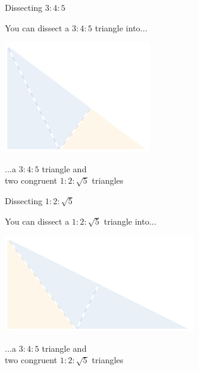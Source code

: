 \documentclass[14pt]{beamer}
\begin{document}

    \begin{frame}{Dissecting $3\!\!:\!\!4\!\!:\!\!5$}
        \begin{center}
            You can dissect a $3\!\!:\!\!4\!\!:\!\!5$ triangle into...

            \bigskip \bigskip

            \includegraphics[height=18ex]{figures/figure006d.pdf}

            \bigskip \bigskip

            ...a $3\!\!:\!\!4\!\!:\!\!5$ triangle and\\two congruent $1\!\!:\!\!2\!\!:\!\!\sqrt{5}$ triangles
        \end{center}
    \end{frame}


    \begin{frame}{Dissecting $1\!\!:\!\!2\!\!:\!\!\sqrt{5}$}
        \begin{center}
            You can dissect a $1\!\!:\!\!2\!\!:\!\!\sqrt{5}$ triangle into...

            \bigskip \bigskip

            \includegraphics[height=18ex]{figures/figure006e.pdf}

            \bigskip \bigskip

            ...a $3\!\!:\!\!4\!\!:\!\!5$ triangle and\\two congruent $1\!\!:\!\!2\!\!:\!\!\sqrt{5}$ triangles
        \end{center}
    \end{frame}
\end{document}
